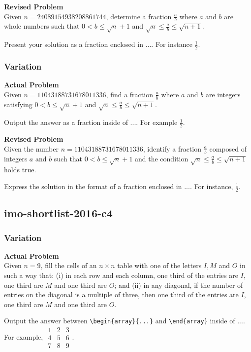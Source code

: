 \textbf{Revised Problem}\\
Given $n = 24089154938208861744$, determine a fraction $\frac{a}{b}$ where $a$ and $b$ are whole numbers such that $0 < b \leq \sqrt{n}+1$ and $\sqrt{n} \leq \frac{a}{b} \leq \sqrt{n+1}$.

Present your solution as a fraction enclosed in $\boxed{...}$. For instance $\boxed{\frac{1}{2}}$.

\subsubsection{Variation}
\textbf{Actual Problem}\\
Given $n = 11043188731678011336$, find a fraction $\frac{a}{b}$ where $a$ and $b$ are integers satisfying $0 < b \leq \sqrt{n}+1$ and $\sqrt{n} \leq \frac{a}{b} \leq \sqrt{n+1}$.

Output the answer as a fraction inside of $\boxed{...}$. For example $\boxed{\frac{1}{2}}$.

\textbf{Revised Problem}\\
Given the number \(n = 11043188731678011336\), identify a fraction \(\frac{a}{b}\) composed of integers \(a\) and \(b\) such that \(0 < b \leq \sqrt{n} + 1\) and the condition \(\sqrt{n} \leq \frac{a}{b} \leq \sqrt{n+1}\) holds true.

Express the solution in the format of a fraction enclosed in \(\boxed{...}\). For instance, \(\boxed{\frac{1}{2}}\).

\subsection{imo-shortlist-2016-c4}
\subsubsection{Variation}
\textbf{Actual Problem}\\
Given $n = 9$, fill the cells of an $n \times n$ table with one of the letters $I,M$ and $O$ in such a way that:
(i) in each row and each column, one third of the entries are $I$, one third are $M$ and one third are $O$; and
(ii) in any diagonal, if the number of entries on the diagonal is a multiple of three, then one third of the entries are $I$, one third are $M$ and one third are $O$.

Output the answer between \verb|\begin{array}{...}| and \verb|\end{array}| inside of $\boxed{...}$. For example, $\boxed{\begin{array}{ccc}1 & 2 & 3 \\ 4 & 5 & 6 \\ 7 & 8 & 9\end{array}}$.

